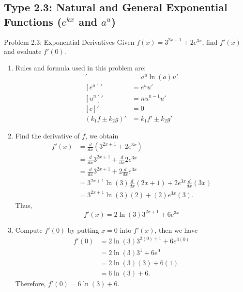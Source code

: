 \documentclass[11pt,a4paper]{article}
\begin{document}
\subsection{Type 2.3: Natural and General Exponential Functions ($e^{kx}$ and $a^u$)}
\begin{problembox}{Problem 2.3: Exponential Derivatives}
Given $f(x) = 3^{2x+1} + 2e^{3x}$, find $f'(x)$ and evaluate $f'(0)$.
\end{problembox}
\begin{solutionbox}
\begin{enumerate}
	\item [Step 1.] Rules and formula used in this problem are:
	\begin{align*}
		[a^u]' &= a^u \ln(a) u' \\
		[e^u]' &= e^u u' \\
		[u^n]' &= n u^{n-1} u' \\
		[c]' &= 0 \\
		(k_1f \pm k_2 g)' &= k_1f' \pm k_2g'
	\end{align*}
	
	\item [Step 2.] Find the derivative of $f$, we obtain
	\begin{align*}
		f'(x) &= \frac{d}{dx} \left(3^{2x+1} + 2e^{3x}\right) \\
		&= \frac{d}{dx} 3^{2x+1} + \frac{d}{dx} 2e^{3x} \\
		&= \frac{d}{dx} 3^{2x+1} + 2 \frac{d}{dx} e^{3x} \\
		&= 3^{2x+1}\ln(3)\frac{d}{dx}(2x+1) + 2e^{3x}\frac{d}{dx}(3x) \\
		&= 3^{2x+1}\ln(3)(2) + (2)e^{3x}(3).
	\end{align*}
	Thus,
	\begin{equation*}
		f'(x) = 2\ln(3)3^{2x+1} + 6e^{3x}
	\end{equation*}
	
	\item [Step 3.] Compute $f'(0)$ by putting $x = 0$ into $f'(x)$, then we have
	\begin{align*}
		f'(0) &= 2\ln(3)3^{2(0)+1} + 6e^{3(0)} \\
		&= 2\ln(3)3^1 + 6e^0 \\
		&= 2\ln(3)(3) + 6(1) \\
		&= 6\ln(3) + 6.
	\end{align*}
	Therefore, $f'(0) = 6\ln(3) + 6$.
	\end{enumerate}
\end{solutionbox}
\end{document}
